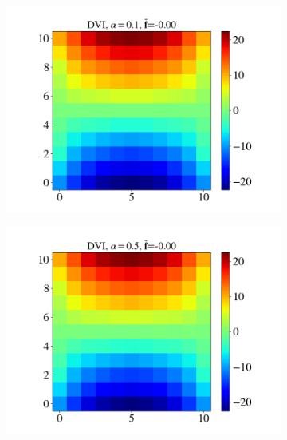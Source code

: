 \begin{itemize}
\begin{figure}[H]
\begin{subfigure}{0.32\columnwidth}
			\includegraphics[width=1.0\textwidth]{images/CD/Example7/10/T1_11_DVI_0.1.png}
		\end{subfigure}
		\begin{subfigure}{0.32\columnwidth}	
			\centering
			\includegraphics[width=1.0\textwidth]{images/CD/Example7/10/T1_11_DVI_0.5.png}
		\end{subfigure}
		\begin{subfigure}{0.32\columnwidth}	
			\centering

\end{subfigure}
\end{figure}
\end{itemize}
